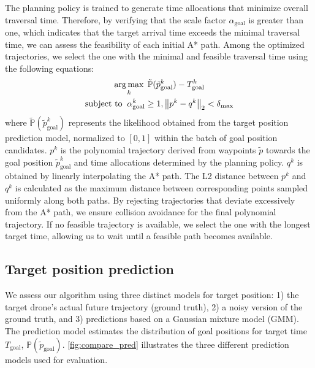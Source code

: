 The planning policy is trained to generate time allocations that minimize overall traversal time. 
Therefore, by verifying that the scale factor $\alpha_\text{goal}$ is greater than one, which indicates that the target arrival time exceeds the minimal traversal time, we can assess the feasibility of each initial A* path. 
Among the optimized trajectories, we select the one with the minimal and feasible traversal time using the following equations:
\begin{equation}
\begin{gathered}
\operatorname*{arg\,max}_{k} \; \tilde{\mathbb{P}}(\tilde p_{\text{goal}}^k) - T_\text{goal}^k \\ 
\text{subject to}\;\; \alpha_\text{goal}^k \geq 1, \left\lVert p^k- q^k\right\rVert_2 < \delta_\text{max} 
\label{eqn:homotopy_1}
\end{gathered}
\end{equation}
where $\tilde{\mathbb{P}}(\tilde p_{\text{goal}}^k)$ represents the likelihood obtained from the target position prediction model, normalized to $[0,1]$ within the batch of goal position candidates.
$p^k$ is the polynomial trajectory derived from waypoints $\tilde p$ towards the goal position $\tilde p_{\text{goal}}^k$ and time allocations determined by the planning policy.
$q^k$ is obtained by linearly interpolating the A* path. 
The L2 distance between $p^k$ and $q^k$ is calculated as the maximum distance between corresponding points sampled uniformly along both paths. 
By rejecting trajectories that deviate excessively from the A* path, we ensure collision avoidance for the final polynomial trajectory.
If no feasible trajectory is available, we select the one with the longest target time, allowing us to wait until a feasible path becomes available.


\subsection{Target position prediction}
We assess our algorithm using three distinct models for target position: 1) the target drone’s actual future trajectory (ground truth), 2) a noisy version of the ground truth, and 3) predictions based on a Gaussian mixture model (GMM).
The prediction model estimates the distribution of goal positions for target time $T_\text{goal}$, $\mathbb{P}(\tilde{p}_\text{goal})$.
\cref{fig:compare_pred} illustrates the three different prediction models used for evaluation.

